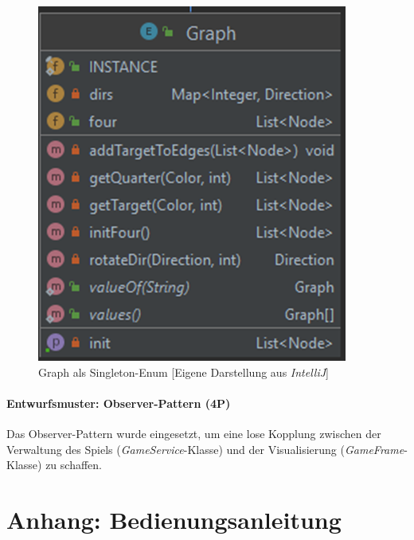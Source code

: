 \begin{figure}[htbp]
\centering
\centerline{\includegraphics[scale=.5]{singleton}}
\caption{Graph als Singleton-Enum [Eigene Darstellung aus \emph{IntelliJ}]}
\label{fig:singleton}
\end{figure}

\newpage
\subsubsection{Entwurfsmuster: Observer-Pattern (4P)}
\noindent Das Observer-Pattern wurde eingesetzt, um eine lose Kopplung zwischen der Verwaltung des Spiels (\emph{GameService}-Klasse) und der Visualisierung (\emph{GameFrame}-Klasse) zu schaffen.

\newpage
\titlespacing*{\chapter}{0pt}{-30mm}{10pt}
  
\chapter{Anhang: Bedienungsanleitung}
\label{ch:anleitung}
\pagestyle{scrheadings}
\clearscrheadfoot
{}
\setcounter{page}{36}
\ofoot[\pagemark]{\pagemark}
\onehalfspacing

